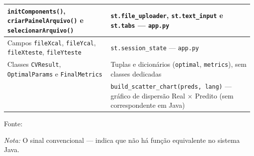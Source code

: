 \begin{quadro}[ht]
\begin{center}
\begin{threeparttable}
\begin{tabularx}{\textwidth}{|>{\raggedright\arraybackslash}X|>{\raggedright\arraybackslash}X|}
\texttt{initComponents()}, \texttt{criarPainelArquivo()} e \texttt{selecionarArquivo()} & \texttt{st.file\_uploader}, \texttt{st.text\_input} e \texttt{st.tabs} --- \texttt{app.py} \\ \hline
Campos \texttt{fileXcal}, \texttt{fileYcal}, \texttt{fileXteste}, \texttt{fileYteste} & \texttt{st.session\_state} --- \texttt{app.py} \\ \hline
Classes \texttt{CVResult}, \texttt{OptimalParams} e \texttt{FinalMetrics} & Tuplas e dicionários (\texttt{optimal}, \texttt{metrics}), sem classes dedicadas \\ \hline
\multicolumn{1}{|c|}{---} & \texttt{build\_scatter\_chart(preds, lang)} --- gráfico de dispersão Real $\times$ Predito (sem correspondente em Java) \\ \hline
\end{tabularx}
\begin{tablenotes}[flushleft]
\footnotesize
\item Fonte:~\oautor
\item \textit{Nota:} O sinal convencional --- indica que não há função equivalente no sistema Java.
\end{tablenotes}
\end{threeparttable}
\end{center}
\end{quadro}
